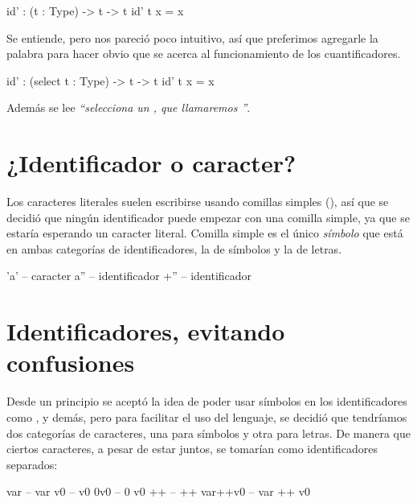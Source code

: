 {\begin{designfr}
\begin{anglercode}
id' : (t : Type) -> t -> t
id' t x = x
\end{anglercode}

Se entiende, pero nos pareció poco intuitivo, así que preferimos agregarle la palabra  para hacer obvio que se acerca al funcionamiento de los cuantificadores.

\begin{anglercode}
id' : (select t : Type) -> t -> t
id' t x = x
\end{anglercode}

Además se lee \emph{\enquote{selecciona un , que llamaremos }}.
\end{designfr}

\section{¿Identificador o caracter?}

\begin{designfr}
Los caracteres literales suelen escribirse usando comillas simples (), así que se decidió que ningún identificador puede empezar con una comilla simple, ya que se estaría esperando un caracter literal. Comilla simple es el único \emph{símbolo} que está en ambas categorías de identificadores, la de símbolos y la de letras.

\begin{anglercode}
'a'     -- caracter
a''     -- identificador
+''     -- identificador
\end{anglercode}
\end{designfr}


\section{Identificadores, evitando confusiones}

\begin{designfr}
Desde un principio se aceptó la idea de poder usar símbolos en los identificadores como \inlinecode{+}, \inlinecode{*} y demás, pero para facilitar el uso del lenguaje, se decidió que tendríamos dos categorías de caracteres, una para símbolos y otra para letras. De manera que ciertos caracteres, a pesar de estar juntos, se tomarían como identificadores separados:

\begin{anglercode}
var         -- var
v0          -- v0
0v0         -- 0 v0
++          -- ++
var++v0     -- var ++ v0
\end{anglercode}
\end{designfr}

}
